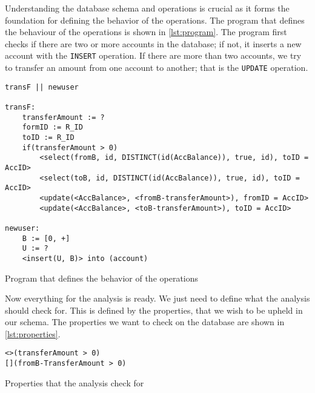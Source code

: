 Understanding the database schema and operations is crucial as it forms the foundation for defining the behavior of the operations.
The program that defines the behaviour of the operations is shown in \autoref{lst:program}.
The program first checks if there are two or more accounts in the database; if not, it inserts a new account with the \texttt{INSERT} operation.
If there are more than two accounts, we try to transfer an amount from one account to another; that is the \texttt{UPDATE} operation.


\begin{listing}[htb!]
    \begin{verbatim}
transF || newuser

transF:
    transferAmount := ?
    formID := R_ID
    toID := R_ID
    if(transferAmount > 0)
        <select(fromB, id, DISTINCT(id(AccBalance)), true, id), toID = AccID>
        <select(toB, id, DISTINCT(id(AccBalance)), true, id), toID = AccID>
        <update(<AccBalance>, <fromB-transferAmount>), fromID = AccID>
        <update(<AccBalance>, <toB-transferAmount>), toID = AccID>

newuser:
    B := [0, +]
    U := ?
    <insert(U, B)> into (account)
    \end{verbatim}
    \caption{Program that defines the behavior of the operations}
    \label{lst:program}
\end{listing}


Now everything for the analysis is ready.
We just need to define what the analysis should check for.
This is defined by the properties, that we wish to be upheld in our schema.
The properties we want to check on the database are shown in \autoref{lst:properties}.





\begin{listing}[htb!]
    \begin{verbatim}
<>(transferAmount > 0)
[](fromB-TransferAmount > 0)
    \end{verbatim}
    \caption{Properties that the analysis check for}
    \label{lst:properties}
\end{listing}


